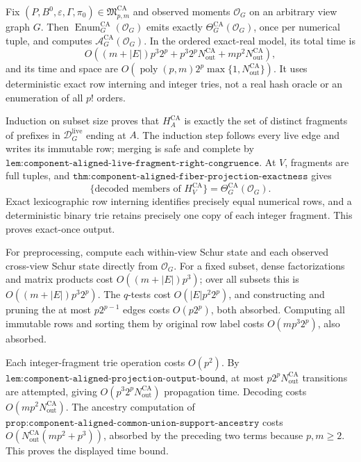 Fix \((P,B^0,\varepsilon,\Gamma,\pi_0)\in\mathfrak M_{p,m}^{\mathrm{CA}}\) and observed moments \(\mathcal O_G\) on an arbitrary view graph \(G\).  Then \(\operatorname{Enum}_G^{\mathrm{CA}}(\mathcal O_G)\) emits exactly \(\Theta_G^{\mathrm{CA}}(\mathcal O_G)\), once per numerical tuple, and computes \(\mathcal A_G^{\mathrm{CA}}(\mathcal O_G)\).  In the ordered exact-real model, its total time is
\[
 O\!\left((m+|E|)p^3 2^p
 +p^3 2^pN_{\mathrm{out}}^{\mathrm{CA}}
 +mp^2N_{\mathrm{out}}^{\mathrm{CA}}\right),
\]
and its time and space are \(O(\operatorname{poly}(p,m)2^p\max\{1,N_{\mathrm{out}}^{\mathrm{CA}}\})\).  It uses deterministic exact row interning and integer tries, not a real hash oracle or an enumeration of all \(p!\) orders.

Induction on subset size proves that \(H_A^{\mathrm{CA}}\) is exactly the set of distinct fragments of prefixes in \(\mathcal D_G^{\mathrm{live}}\) ending at \(A\).  The induction step follows every live edge and writes its immutable row; merging is safe and complete by \(\texttt{lem:component-aligned-live-fragment-right-congruence}\).  At \(V\), fragments are full tuples, and \(\texttt{thm:component-aligned-fiber-projection-exactness}\) gives
\[
 \{\text{decoded members of }H_V^{\mathrm{CA}}\}
 =\Theta_G^{\mathrm{CA}}(\mathcal O_G).
\]
Exact lexicographic row interning identifies precisely equal numerical rows, and a deterministic binary trie retains precisely one copy of each integer fragment.  This proves exact-once output.

For preprocessing, compute each within-view Schur state and each observed cross-view Schur state directly from \(\mathcal O_G\).  For a fixed subset, dense factorizations and matrix products cost \(O((m+|E|)p^3)\); over all subsets this is \(O((m+|E|)p^3 2^p)\).  The \(q\)-tests cost \(O(|E|p^2 2^p)\), and constructing and pruning the at most \(p2^{p-1}\) edges costs \(O(p2^p)\), both absorbed.  Computing all immutable rows and sorting them by original row label costs \(O(mp^3 2^p)\), also absorbed.

Each integer-fragment trie operation costs \(O(p^2)\).  By \(\texttt{lem:component-aligned-projection-output-bound}\), at most \(p2^pN_{\mathrm{out}}^{\mathrm{CA}}\) transitions are attempted, giving \(O(p^3 2^pN_{\mathrm{out}}^{\mathrm{CA}})\) propagation time.  Decoding costs \(O(mp^2N_{\mathrm{out}}^{\mathrm{CA}})\).  The ancestry computation of \(\texttt{prop:component-aligned-common-union-support-ancestry}\) costs \(O(N_{\mathrm{out}}^{\mathrm{CA}}(mp^2+p^3))\), absorbed by the preceding two terms because \(p,m\ge2\).  This proves the displayed time bound.

